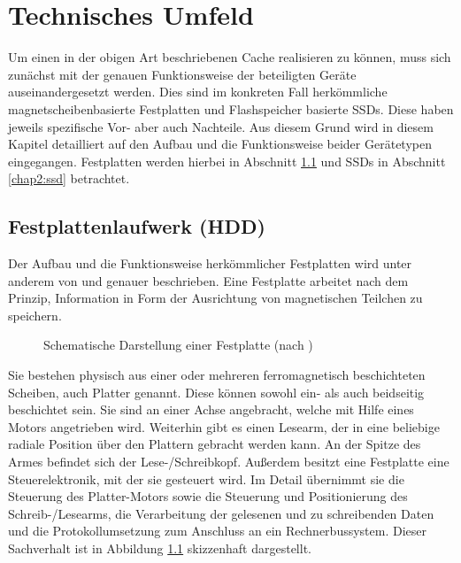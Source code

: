 \chapter{Technisches Umfeld}
\label{chap2}

Um einen in der obigen Art beschriebenen Cache realisieren zu können, muss sich zunächst mit der genauen Funktionsweise der beteiligten Geräte
auseinandergesetzt werden. Dies sind im konkreten Fall herkömmliche magnetscheibenbasierte Festplatten und Flashspeicher basierte \acp{SSD}. Diese haben jeweils
spezifische Vor- aber auch Nachteile. Aus diesem Grund wird in diesem Kapitel detailliert auf den Aufbau und die Funktionsweise beider Gerätetypen eingegangen.
Festplatten werden hierbei in Abschnitt \ref{chap2:hdd} und \acp{SSD} in Abschnitt \ref{chap2:ssd} betrachtet.

\section{Festplattenlaufwerk (HDD)}
\label{chap2:hdd}

Der Aufbau und die Funktionsweise herkömmlicher Festplatten wird unter anderem von \textcite{info2} und \textcite{tanenbaum1} genauer beschrieben. Eine Festplatte
arbeitet nach dem Prinzip, Information in Form der Ausrichtung von magnetischen Teilchen zu speichern.

\begin{figure}[b!]\centering
    \caption[Schematische Darstellung einer Festplatte]{Schematische Darstellung einer Festplatte (nach \textcite[101]{tanenbaum1})}
    \label{img:hdd1}
\end{figure}

Sie bestehen physisch aus einer oder mehreren ferromagnetisch beschichteten Scheiben, auch Platter genannt. Diese können sowohl ein- als auch beidseitig
beschichtet sein. Sie sind an einer Achse angebracht, welche mit Hilfe eines Motors angetrieben wird. Weiterhin gibt es einen Lesearm, der in eine beliebige
radiale Position über den Plattern gebracht werden kann. An der Spitze des Armes befindet sich der Lese-/Schreibkopf. Außerdem besitzt eine Festplatte eine
Steuerelektronik, mit der sie gesteuert wird. Im Detail übernimmt sie die Steuerung des Platter-Motors sowie die Steuerung und Positionierung des
Schreib-/Lesearms, die Verarbeitung der gelesenen und zu schreibenden Daten und die Protokollumsetzung zum Anschluss an ein Rechnerbussystem. Dieser Sachverhalt
ist in Abbildung \ref{img:hdd1} skizzenhaft dargestellt.

